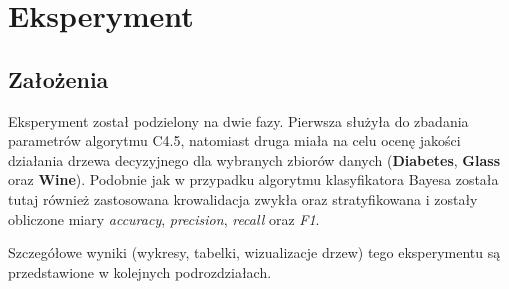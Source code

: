 \pagebreak
\section{Eksperyment}
    \subsection{Założenia}
    Eksperyment został podzielony na dwie fazy. Pierwsza służyła do zbadania parametrów
    algorytmu C4.5, natomiast druga miała na celu ocenę jakości działania drzewa decyzyjnego
    dla wybranych zbiorów danych (\textbf{Diabetes}, \textbf{Glass} oraz \textbf{Wine}). Podobnie
    jak w przypadku algorytmu klasyfikatora Bayesa została tutaj również zastosowana krowalidacja
    zwykła oraz stratyfikowana i zostały obliczone miary \textit{accuracy}, \textit{precision}, 
    \textit{recall} oraz \textit{F1}.

    Szczegółowe wyniki (wykresy, tabelki, wizualizacje drzew) tego eksperymentu są przedstawione w kolejnych podrozdziałach.

    
    
